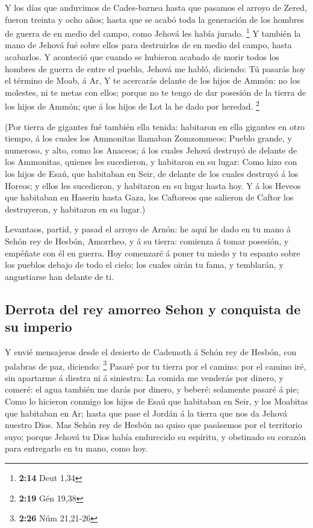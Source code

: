  Y los días que anduvimos de Cades-barnea hasta que pasamos
el arroyo de Zered, fueron treinta y ocho años; hasta que se acabó toda
la generación de los hombres de guerra de en medio del campo, como
Jehová les había jurado. \footnote{\textbf{2:14} Deut 1,34}
 Y también la mano de Jehová fué sobre ellos para
destruirlos de en medio del campo, hasta acabarlos.  Y
aconteció que cuando se hubieron acabado de morir todos los hombres de
guerra de entre el pueblo,  Jehová me habló, diciendo:
 Tú pasarás hoy el término de Moab, á Ar,  Y
te acercarás delante de los hijos de Ammón: no los molestes, ni te metas
con ellos; porque no te tengo de dar posesión de la tierra de los hijos
de Ammón; que á los hijos de Lot la he dado por heredad. \footnote{\textbf{2:19}
  Gén 19,38}

 (Por tierra de gigantes fué también ella tenida: habitaron
en ella gigantes en otro tiempo, á los cuales los Ammonitas llamaban
Zomzommeos;  Pueblo grande, y numeroso, y alto, como los
Anaceos; á los cuales Jehová destruyó de delante de los Ammonitas,
quienes les sucedieron, y habitaron en su lugar:  Como hizo
con los hijos de Esaú, que habitaban en Seir, de delante de los cuales
destruyó á los Horeos; y ellos les sucedieron, y habitaron en su lugar
hasta hoy.  Y á los Heveos que habitaban en Haserin hasta
Gaza, los Caftoreos que salieron de Caftor los destruyeron, y habitaron
en su lugar.)

 Levantaos, partid, y pasad el arroyo de Arnón: he aquí he
dado en tu mano á Sehón rey de Hesbón, Amorrheo, y á su tierra: comienza
á tomar posesión, y empéñate con él en guerra.  Hoy
comenzaré á poner tu miedo y tu espanto sobre los pueblos debajo de todo
el cielo; los cuales oirán tu fama, y temblarán, y angustiarse han
delante de ti.

\hypertarget{derrota-del-rey-amorreo-sehon-y-conquista-de-su-imperio}{%
\subsection{Derrota del rey amorreo Sehon y conquista de su
imperio}\label{derrota-del-rey-amorreo-sehon-y-conquista-de-su-imperio}}

 Y envié mensajeros desde el desierto de Cademoth á Sehón
rey de Hesbón, con palabras de paz, diciendo: \footnote{\textbf{2:26}
  Núm 21,21-26}  Pasaré por tu tierra por el camino: por el
camino iré, sin apartarme á diestra ni á siniestra:  La
comida me venderás por dinero, y comeré: el agua también me darás por
dinero, y beberé: solamente pasaré á pie;  Como lo hicieron
conmigo los hijos de Esaú que habitaban en Seir, y los Moabitas que
habitaban en Ar; hasta que pase el Jordán á la tierra que nos da Jehová
nuestro Dios.  Mas Sehón rey de Hesbón no quiso que
pasásemos por el territorio suyo; porque Jehová tu Dios había endurecido
su espíritu, y obstinado su corazón para entregarlo en tu mano, como
hoy.

